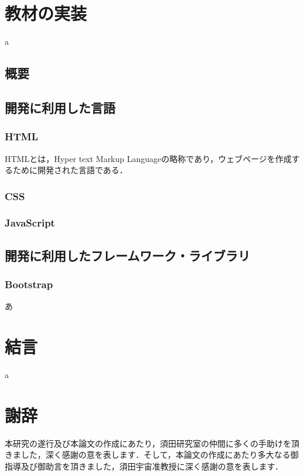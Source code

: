 \documentclass[12pt,a4j,titlepage]{ltjsarticle}
\begin{document}
\section{教材の実装}%
a
\subsection{概要}
\subsection{開発に利用した言語}
\subsubsection{HTML}
HTMLとは，Hyper text Markup Languageの略称であり，ウェブページを作成するために開発された言語である．
\subsubsection{CSS}
\subsubsection{JavaScript}

\subsection{開発に利用したフレームワーク・ライブラリ}
\subsubsection{Bootstrap}
あ

\clearpage

\section{結言}%
a
\clearpage

\section{謝辞}%
本研究の遂行及び本論文の作成にあたり，須田研究室の仲間に多くの手助けを頂きました，深く感謝の意を表します．そして，本論文の作成にあたり多大なる御指導及び御助言を頂きました，須田宇宙准教授に深く感謝の意を表します．
\clearpage
\end{document}
